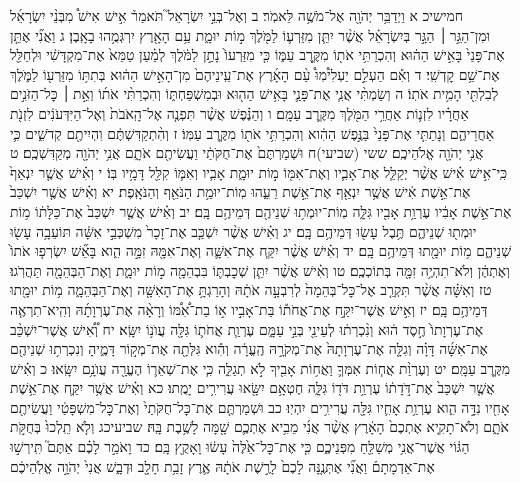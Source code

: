 \documentclass[twoside, openany, parskip=half, 11pt]{book}
\begin{document}
חמישיכ א וַיְדַבֵּ֥ר יְהֹוָ֖ה אֶל־מֹשֶׁ֥ה לֵּאמֹֽר׃ ב וְאֶל־בְּנֵ֣י יִשְׂרָאֵל֮ תֹּאמַר֒ אִ֣ישׁ אִישׁ֩ מִבְּנֵ֨י יִשְׂרָאֵ֜ל וּמִן־הַגֵּ֣ר ׀ הַגָּ֣ר בְּיִשְׂרָאֵ֗ל אֲשֶׁ֨ר יִתֵּ֧ן מִזַּרְע֛וֹ לַמֹּ֖לֶךְ מ֣וֹת יוּמָ֑ת עַ֥ם הָאָ֖רֶץ יִרְגְּמֻ֥הוּ בָאָֽבֶן׃ ג וַאֲנִ֞י אֶתֵּ֤ן אֶת־פָּנַי֙ בָּאִ֣ישׁ הַה֔וּא וְהִכְרַתִּ֥י אֹת֖וֹ מִקֶּ֣רֶב עַמּ֑וֹ כִּ֤י מִזַּרְעוֹ֙ נָתַ֣ן לַמֹּ֔לֶךְ לְמַ֗עַן טַמֵּא֙ אֶת־מִקְדָּשִׁ֔י וּלְחַלֵּ֖ל אֶת־שֵׁ֥ם קׇדְשִֽׁי׃ ד וְאִ֡ם הַעְלֵ֣ם יַעְלִ֩ימֽוּ֩ עַ֨ם הָאָ֜רֶץ אֶת־עֵֽינֵיהֶם֙ מִן־הָאִ֣ישׁ הַה֔וּא בְּתִתּ֥וֹ מִזַּרְע֖וֹ לַמֹּ֑לֶךְ לְבִלְתִּ֖י הָמִ֥ית אֹתֽוֹ׃ ה וְשַׂמְתִּ֨י אֲנִ֧י אֶת־פָּנַ֛י בָּאִ֥ישׁ הַה֖וּא וּבְמִשְׁפַּחְתּ֑וֹ וְהִכְרַתִּ֨י אֹת֜וֹ וְאֵ֣ת ׀ כׇּל־הַזֹּנִ֣ים אַחֲרָ֗יו לִזְנ֛וֹת אַחֲרֵ֥י הַמֹּ֖לֶךְ מִקֶּ֥רֶב עַמָּֽם׃ ו וְהַנֶּ֗פֶשׁ אֲשֶׁ֨ר תִּפְנֶ֤ה אֶל־הָֽאֹבֹת֙ וְאֶל־הַיִּדְּעֹנִ֔ים לִזְנֹ֖ת אַחֲרֵיהֶ֑ם וְנָתַתִּ֤י אֶת־פָּנַי֙ בַּנֶּ֣פֶשׁ הַהִ֔וא וְהִכְרַתִּ֥י אֹת֖וֹ מִקֶּ֥רֶב עַמּֽוֹ׃ ז וְהִ֨תְקַדִּשְׁתֶּ֔ם וִהְיִיתֶ֖ם קְדֹשִׁ֑ים כִּ֛י אֲנִ֥י יְהֹוָ֖ה אֱלֹהֵיכֶֽם׃ ששי (שביעי)ח וּשְׁמַרְתֶּם֙ אֶת־חֻקֹּתַ֔י וַעֲשִׂיתֶ֖ם אֹתָ֑ם אֲנִ֥י יְהֹוָ֖ה מְקַדִּשְׁכֶֽם׃ ט כִּֽי־אִ֣ישׁ אִ֗ישׁ אֲשֶׁ֨ר יְקַלֵּ֧ל אֶת־אָבִ֛יו וְאֶת־אִמּ֖וֹ מ֣וֹת יוּמָ֑ת אָבִ֧יו וְאִמּ֛וֹ קִלֵּ֖ל דָּמָ֥יו בּֽוֹ׃ י וְאִ֗ישׁ אֲשֶׁ֤ר יִנְאַף֙ אֶת־אֵ֣שֶׁת אִ֔ישׁ אֲשֶׁ֥ר יִנְאַ֖ף אֶת־אֵ֣שֶׁת רֵעֵ֑הוּ מֽוֹת־יוּמַ֥ת הַנֹּאֵ֖ף וְהַנֹּאָֽפֶת׃ יא וְאִ֗ישׁ אֲשֶׁ֤ר יִשְׁכַּב֙ אֶת־אֵ֣שֶׁת אָבִ֔יו עֶרְוַ֥ת אָבִ֖יו גִּלָּ֑ה מֽוֹת־יוּמְת֥וּ שְׁנֵיהֶ֖ם דְּמֵיהֶ֥ם בָּֽם׃ יב וְאִ֗ישׁ אֲשֶׁ֤ר יִשְׁכַּב֙ אֶת־כַּלָּת֔וֹ מ֥וֹת יוּמְת֖וּ שְׁנֵיהֶ֑ם תֶּ֥בֶל עָשׂ֖וּ דְּמֵיהֶ֥ם בָּֽם׃ יג וְאִ֗ישׁ אֲשֶׁ֨ר יִשְׁכַּ֤ב אֶת־זָכָר֙ מִשְׁכְּבֵ֣י אִשָּׁ֔ה תּוֹעֵבָ֥ה עָשׂ֖וּ שְׁנֵיהֶ֑ם מ֥וֹת יוּמָ֖תוּ דְּמֵיהֶ֥ם בָּֽם׃ יד וְאִ֗ישׁ אֲשֶׁ֨ר יִקַּ֧ח אֶת־אִשָּׁ֛ה וְאֶת־אִמָּ֖הּ זִמָּ֣ה הִ֑וא בָּאֵ֞שׁ יִשְׂרְפ֤וּ אֹתוֹ֙ וְאֶתְהֶ֔ן וְלֹא־תִהְיֶ֥ה זִמָּ֖ה בְּתוֹכְכֶֽם׃ טו וְאִ֗ישׁ אֲשֶׁ֨ר יִתֵּ֧ן שְׁכׇבְתּ֛וֹ בִּבְהֵמָ֖ה מ֣וֹת יוּמָ֑ת וְאֶת־הַבְּהֵמָ֖ה תַּהֲרֹֽגוּ׃ טז וְאִשָּׁ֗ה אֲשֶׁ֨ר תִּקְרַ֤ב אֶל־כׇּל־בְּהֵמָה֙ לְרִבְעָ֣ה אֹתָ֔הּ וְהָרַגְתָּ֥ אֶת־הָאִשָּׁ֖ה וְאֶת־הַבְּהֵמָ֑ה מ֥וֹת יוּמָ֖תוּ דְּמֵיהֶ֥ם בָּֽם׃ יז וְאִ֣ישׁ אֲשֶׁר־יִקַּ֣ח אֶת־אֲחֹת֡וֹ בַּת־אָבִ֣יו א֣וֹ בַת־אִ֠מּ֠וֹ וְרָאָ֨ה אֶת־עֶרְוָתָ֜הּ וְהִֽיא־תִרְאֶ֤ה אֶת־עֶרְוָתוֹ֙ חֶ֣סֶד ה֔וּא וְנִ֨כְרְת֔וּ לְעֵינֵ֖י בְּנֵ֣י עַמָּ֑ם עֶרְוַ֧ת אֲחֹת֛וֹ גִּלָּ֖ה עֲוֺנ֥וֹ יִשָּֽׂא׃ יח וְ֠אִ֠ישׁ אֲשֶׁר־יִשְׁכַּ֨ב אֶת־אִשָּׁ֜ה דָּוָ֗ה וְגִלָּ֤ה אֶת־עֶרְוָתָהּ֙ אֶת־מְקֹרָ֣הּ הֶֽעֱרָ֔ה וְהִ֕וא גִּלְּתָ֖ה אֶת־מְק֣וֹר דָּמֶ֑יהָ וְנִכְרְת֥וּ שְׁנֵיהֶ֖ם מִקֶּ֥רֶב עַמָּֽם׃ יט וְעֶרְוַ֨ת אֲח֧וֹת אִמְּךָ֛ וַאֲח֥וֹת אָבִ֖יךָ לֹ֣א תְגַלֵּ֑ה כִּ֧י אֶת־שְׁאֵר֛וֹ הֶעֱרָ֖ה עֲוֺנָ֥ם יִשָּֽׂאוּ׃ כ וְאִ֗ישׁ אֲשֶׁ֤ר יִשְׁכַּב֙ אֶת־דֹּ֣דָת֔וֹ עֶרְוַ֥ת דֹּד֖וֹ גִּלָּ֑ה חֶטְאָ֥ם יִשָּׂ֖אוּ עֲרִירִ֥ים יָמֻֽתוּ׃ כא וְאִ֗ישׁ אֲשֶׁ֥ר יִקַּ֛ח אֶת־אֵ֥שֶׁת אָחִ֖יו נִדָּ֣ה הִ֑וא עֶרְוַ֥ת אָחִ֛יו גִּלָּ֖ה עֲרִירִ֥ים יִהְיֽוּ׃ כב וּשְׁמַרְתֶּ֤ם אֶת־כׇּל־חֻקֹּתַי֙ וְאֶת־כׇּל־מִשְׁפָּטַ֔י וַעֲשִׂיתֶ֖ם אֹתָ֑ם וְלֹא־תָקִ֤יא אֶתְכֶם֙ הָאָ֔רֶץ אֲשֶׁ֨ר אֲנִ֜י מֵבִ֥יא אֶתְכֶ֛ם שָׁ֖מָּה לָשֶׁ֥בֶת בָּֽהּ׃ שביעיכג וְלֹ֤א תֵֽלְכוּ֙ בְּחֻקֹּ֣ת הַגּ֔וֹי אֲשֶׁר־אֲנִ֥י מְשַׁלֵּ֖חַ מִפְּנֵיכֶ֑ם כִּ֤י אֶת־כׇּל־אֵ֙לֶּה֙ עָשׂ֔וּ וָאָקֻ֖ץ בָּֽם׃ כד וָאֹמַ֣ר לָכֶ֗ם אַתֶּם֮ תִּֽירְשׁ֣וּ אֶת־אַדְמָתָם֒ וַאֲנִ֞י אֶתְּנֶ֤נָּה לָכֶם֙ לָרֶ֣שֶׁת אֹתָ֔הּ אֶ֛רֶץ זָבַ֥ת חָלָ֖ב וּדְבָ֑שׁ אֲנִי֙ יְהֹוָ֣ה אֱלֹֽהֵיכֶ֔ם 
\end{document}
